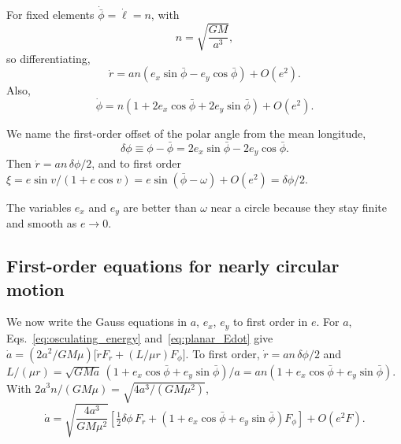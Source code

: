 	For fixed elements $\dot{\bar\phi}=\dot\ell=n$, with
	\begin{equation}
		n=\sqrt{\frac{GM}{a^3}},
	\end{equation}
	so differentiating,
	\begin{equation}
		\dot r
		=
		an
		\left(
		e_x\sin\bar\phi-e_y\cos\bar\phi
		\right)
		+O(e^2).
	\end{equation}
	Also,
	\begin{equation}
		\boxed{
			\dot\phi
			=
			n
			\left(
			1+2e_x\cos\bar\phi
			+2e_y\sin\bar\phi
			\right)
			+O(e^2).
		}
		\label{eq:small_e_theta_dot}
	\end{equation}
	
	We name the first-order offset of the polar angle from the mean longitude,
	\begin{equation}
		\delta\phi
		\equiv
		\phi-\bar\phi
		=
		2e_x\sin\bar\phi
		-
		2e_y\cos\bar\phi .
	\end{equation}
	Then $\dot r=an\,\delta\phi/2$, and to first order $\xi=e\sin v/(1+e\cos v)=e\sin(\bar\phi-\omega)+O(e^2)=\delta\phi/2$.
	
	The variables $e_x$ and $e_y$ are better than $\omega$ near a circle because they stay finite and smooth as $e\to0$.
	
	\subsection{First-order equations for nearly circular motion}
	
	We now write the Gauss equations in $a$, $e_x$, $e_y$ to first order in $e$. For $a$, Eqs.~\eqref{eq:osculating_energy} and~\eqref{eq:planar_Edot} give $\dot a=(2a^2/GM\mu)\big[\dot rF_r+(L/\mu r)F_\phi\big]$. To first order, $\dot r=an\,\delta\phi/2$ and $L/(\mu r)=\sqrt{GMa}\,(1+e_x\cos\bar\phi+e_y\sin\bar\phi)/a=an(1+e_x\cos\bar\phi+e_y\sin\bar\phi)$. With $2a^3n/(GM\mu)=\sqrt{4a^3/(GM\mu^2)}$,
	\begin{equation}
		\boxed{
			\dot a
			=
			\sqrt{\frac{4a^3}{GM\mu^2}}
			\left[
			\tfrac12\delta\phi\,F_r
			+
			\left(
			1+e_x\cos\bar\phi+e_y\sin\bar\phi
			\right)F_{\phi}
			\right]
			+O(e^2F).
		}
		\label{eq:LL_adot}
	\end{equation}
	
